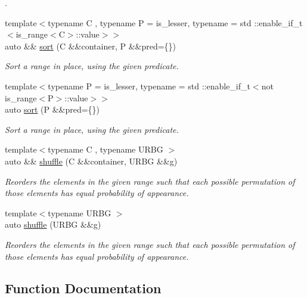 \begin{DoxyCompactItemize}
\begin{DoxyCompactList}
. \end{DoxyCompactList}\item 
{\footnotesize template$<$typename C , typename P  = is\+\_\+lesser, typename  = std \+::enable\+\_\+if\+\_\+t$<$is\+\_\+range$<$\+C$>$\+::value$>$$>$ }\\auto \&\& \mbox{\hyperlink{namespacerah_1_1action_ae8518431f6e5e7415a6739c65e874ab8}{sort}} (C \&\&container, P \&\&pred=\{\})
\begin{DoxyCompactList}\small\item\em Sort a range in place, using the given predicate. \end{DoxyCompactList}\item 
{\footnotesize template$<$typename P  = is\+\_\+lesser, typename  = std \+::enable\+\_\+if\+\_\+t$<$not is\+\_\+range$<$\+P$>$\+::value$>$$>$ }\\auto \mbox{\hyperlink{namespacerah_1_1action_ac1603fdf8fc87e84c277c216a5176674}{sort}} (P \&\&pred=\{\})
\begin{DoxyCompactList}\small\item\em Sort a range in place, using the given predicate. \end{DoxyCompactList}\item 
{\footnotesize template$<$typename C , typename U\+R\+BG $>$ }\\auto \&\& \mbox{\hyperlink{namespacerah_1_1action_ab9352bcbc01fd4fa9eeba64766fa32b3}{shuffle}} (C \&\&container, U\+R\+BG \&\&g)
\begin{DoxyCompactList}\small\item\em Reorders the elements in the given range such that each possible permutation of those elements has equal probability of appearance. \end{DoxyCompactList}\item 
{\footnotesize template$<$typename U\+R\+BG $>$ }\\auto \mbox{\hyperlink{namespacerah_1_1action_add6b8e704a8e603302290792a45a5c06}{shuffle}} (U\+R\+BG \&\&g)
\begin{DoxyCompactList}\small\item\em Reorders the elements in the given range such that each possible permutation of those elements has equal probability of appearance. \end{DoxyCompactList}\end{DoxyCompactItemize}


\subsection{Function Documentation}
\mbox{\label{namespacerah_1_1action_a759ca023dec90e65e7d0e0327ae11af7}} 
